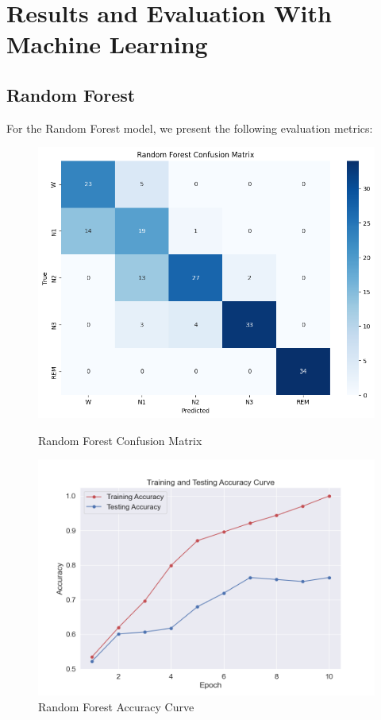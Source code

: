 \section{Results and Evaluation With Machine Learning }

 


\subsection{Random Forest}

For the Random Forest model, we present the following evaluation metrics:

\begin{figure}[H]
	\centering
	\begin{minipage}[b]{0.45\textwidth}
		\centering
		\includegraphics[width=\textwidth]{img/paper_1/random_forest_confusion_matrix.png}
		\caption{Random Forest Confusion Matrix}
	\end{minipage}
	\hfill
	\begin{minipage}[b]{0.45\textwidth}
		\centering
		\includegraphics[width=\textwidth]{img/paper_1/accuracy_curve.png}
		\caption{Random Forest Accuracy Curve}
	\end{minipage}
	

\end{figure}
